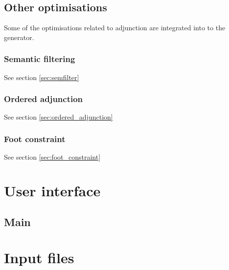 \documentclass[a4paper,11pt]{report}
\begin{document}
       
       
% 

\chapter{Other optimisations}
\label{chp:other_optimisations}

Some of the optimisations related to adjunction are integrated into
to the generator.

\section{Semantic filtering}

See section \ref{sec:semfilter}

\section{Ordered adjunction}

See section \ref{sec:ordered_adjunction}

\section{Foot constraint}

See section \ref{sec:foot_constraint}

\part{User interface}

\chapter{Main}







\part{Input files}




\end{document}
